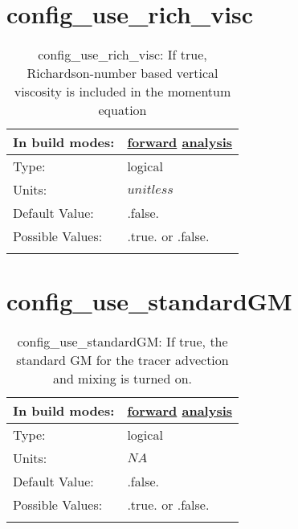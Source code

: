 \section[config\_use\_rich\_visc]{config\_use\_rich\_visc}
\label{sec:nm_sec_config_use_rich_visc}
\begin{center}
\begin{longtable}{| p{2.0in} || p{4.0in} |}
    \hline
    In build modes: & \hyperref[subsec:forward_nm_tab_vmix_rich]{forward} \hyperref[subsec:analysis_nm_tab_vmix_rich]{analysis} \\
    \hline
    Type: & logical \\
    \hline
    Units: & $unitless$ \\
    \hline
    Default Value: & .false. \\
    \hline
    Possible Values: & .true. or .false. \\
    \hline
    \caption{config\_use\_rich\_visc: If true, Richardson-number based vertical viscosity is included in the momentum equation}
\end{longtable}
\end{center}
\section[config\_use\_standardGM]{config\_use\_standardGM}
\label{sec:nm_sec_config_use_standardGM}
\begin{center}
\begin{longtable}{| p{2.0in} || p{4.0in} |}
    \hline
    In build modes: & \hyperref[subsec:forward_nm_tab_mesoscale_eddy_parameterization]{forward} \hyperref[subsec:analysis_nm_tab_mesoscale_eddy_parameterization]{analysis} \\
    \hline
    Type: & logical \\
    \hline
    Units: & $NA$ \\
    \hline
    Default Value: & .false. \\
    \hline
    Possible Values: & .true. or .false. \\
    \hline
    \caption{config\_use\_standardGM: If true, the standard GM for the tracer advection and mixing is turned on.}
\end{longtable}
\end{center}
